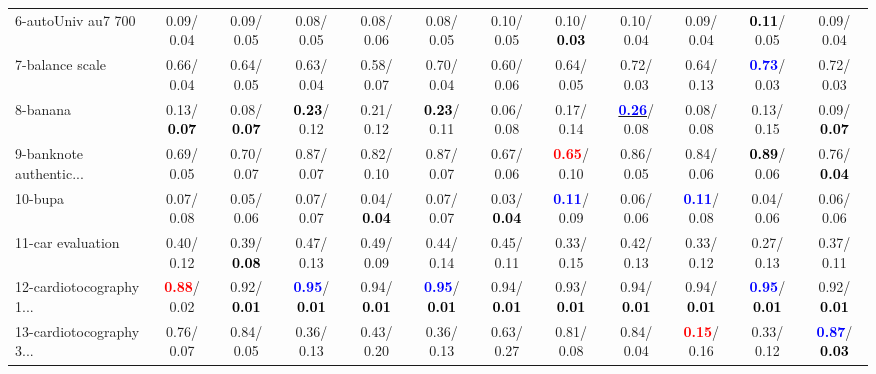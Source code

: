 \begin{table}[h]
\begin{center}
{\begin{tabular}{lc|c|c|c|c|c|c|c|c|c|c}
6-autoUniv au7 700 &   0.09/  0.04 &   0.09/  0.05 &   0.08/  0.05 &   0.08/  0.06 &   0.08/  0.05 &   0.10/  0.05 &   0.10/\textcolor{black}{\textbf{  0.03}} &   0.10/  0.04 &   0.09/  0.04 & \textcolor{black}{\textbf{  0.11}}/  0.05 &   0.09/  0.04 \\
7-balance scale &   0.66/  0.04 &   0.64/  0.05 &   0.63/  0.04 &   0.58/  0.07 &   0.70/  0.04 &   0.60/  0.06 &   0.64/  0.05 &   0.72/  0.03 &   0.64/  0.13 & \textcolor{blue}{\textbf{  0.73}}/  0.03 &   0.72/  0.03 \\ \hline
8-banana &   0.13/\textcolor{black}{\textbf{  0.07}} &   0.08/\textcolor{black}{\textbf{  0.07}} & \textcolor{black}{\textbf{  0.23}}/  0.12 &   0.21/  0.12 & \textcolor{black}{\textbf{  0.23}}/  0.11 &   0.06/  0.08 &   0.17/  0.14 & \underline{\textcolor{blue}{\textbf{  0.26}}}/  0.08 &   0.08/  0.08 &   0.13/  0.15 &   0.09/\textcolor{black}{\textbf{  0.07}} \\
9-banknote authentic... &   0.69/  0.05 &   0.70/  0.07 &   0.87/  0.07 &   0.82/  0.10 &   0.87/  0.07 &   0.67/  0.06 & \textcolor{red}{\textbf{  0.65}}/  0.10 &   0.86/  0.05 &   0.84/  0.06 & \textcolor{black}{\textbf{  0.89}}/  0.06 &   0.76/\textcolor{black}{\textbf{  0.04}} \\
10-bupa &   0.07/  0.08 &   0.05/  0.06 &   0.07/  0.07 &   0.04/\textcolor{black}{\textbf{  0.04}} &   0.07/  0.07 &   0.03/\textcolor{black}{\textbf{  0.04}} & \textcolor{blue}{\textbf{  0.11}}/  0.09 &   0.06/  0.06 & \textcolor{blue}{\textbf{  0.11}}/  0.08 &   0.04/  0.06 &   0.06/  0.06 \\
11-car evaluation &   0.40/  0.12 &   0.39/\textcolor{black}{\textbf{  0.08}} &   0.47/  0.13 &   0.49/  0.09 &   0.44/  0.14 &   0.45/  0.11 &   0.33/  0.15 &   0.42/  0.13 &   0.33/  0.12 &   0.27/  0.13 &   0.37/  0.11 \\
12-cardiotocography 1... & \textcolor{red}{\textbf{  0.88}}/  0.02 &   0.92/\textcolor{black}{\textbf{  0.01}} & \textcolor{blue}{\textbf{  0.95}}/\textcolor{black}{\textbf{  0.01}} &   0.94/\textcolor{black}{\textbf{  0.01}} & \textcolor{blue}{\textbf{  0.95}}/\textcolor{black}{\textbf{  0.01}} &   0.94/\textcolor{black}{\textbf{  0.01}} &   0.93/\textcolor{black}{\textbf{  0.01}} &   0.94/\textcolor{black}{\textbf{  0.01}} &   0.94/\textcolor{black}{\textbf{  0.01}} & \textcolor{blue}{\textbf{  0.95}}/\textcolor{black}{\textbf{  0.01}} &   0.92/\textcolor{black}{\textbf{  0.01}} \\
13-cardiotocography 3... &   0.76/  0.07 &   0.84/  0.05 &   0.36/  0.13 &   0.43/  0.20 &   0.36/  0.13 &   0.63/  0.27 &   0.81/  0.08 &   0.84/  0.04 & \textcolor{red}{\textbf{  0.15}}/  0.16 &   0.33/  0.12 & \textcolor{blue}{\textbf{  0.87}}/\textcolor{black}{\textbf{  0.03}} \\

\end{tabular}}
\end{center}
\end{table}
